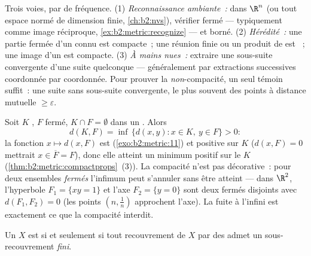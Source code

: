 \begin{method}\label{met:b2:metric:compactness}
Trois voies, par  de fréquence. (1) \emph{Reconnaissance
ambiante~:} dans $\R^n$ (ou tout espace normé de dimension finie,
\cref{ch:b2:nvs}), vérifier fermé --- typiquement comme image
réciproque, \cref{ex:b2:metric:recognize} --- et borné. (2)
\emph{Hérédité~:} une partie fermée d'un  connu est compacte~;
une réunion finie ou un produit de  est ~; une image
 d'un  est compacte. (3) \emph{À mains nues~:}
extraire une sous-suite convergente d'une suite quelconque ---
généralement par extractions successives coordonnée par coordonnée.
Pour prouver la \emph{non}-compacité, un seul témoin suffit~: une
suite sans sous-suite convergente, le plus souvent des points à
distance mutuelle $\geq \varepsilon$.
\end{method}

\begin{example}\label{ex:b2:metric:setdistance}
Soit $K$ , $F$ fermé, $K \cap F = \emptyset$ dans un . Alors
\[
d(K, F) = \inf\,\{d(x, y) : x \in K,\ y \in F\} > 0 :
\]
la fonction $x \mapsto d(x, F)$ est 
(\cref{exo:b2:metric:11}) et positive sur $K$ ($d(x, F) = 0$
mettrait $x \in \overline F = F$), donc elle atteint un minimum
positif sur le  $K$
(\cref{thm:b2:metric:compactprops}~(3)). La compacité n'est pas
décorative~: pour deux ensembles \emph{fermés} l'infimum peut
s'annuler sans être atteint --- dans $\R^2$, l'hyperbole $F_1 = \{xy
= 1\}$ et l'axe $F_2 = \{y = 0\}$ sont deux fermés disjoints avec
$d(F_1, F_2) = 0$ (les points $(n, \frac1n)$ approchent l'axe). La
fuite à l'infini est exactement ce que la compacité interdit.
\end{example}

\begin{theorem}\label{thm:b2:metric:borellebesgue}
Un  $X$ est  si et seulement si tout
recouvrement de $X$ par des  admet un sous-recouvrement
\emph{fini}.
\end{theorem}

